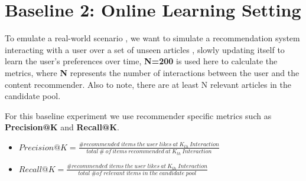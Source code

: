 \documentclass[a4paper,fontsize=8.0pt]{scrartcl}
\begin{document}
\section{Baseline 2: Online Learning Setting}
\begin{flushleft}
To emulate a real-world scenario , we want to simulate a recommendation system interacting with a user over a set of unseen articles , slowly updating itself to learn the user's preferences over time, \textbf{N=200} is used here to calculate the metrics, where \textbf{N }represents the number of interactions between the user and the content recommender. Also to note, there are at least N relevant articles in the candidate pool. 
\end{flushleft}
\begin{flushleft}
For this baseline experiment we use recommender specific metrics such as \textbf{Precision@K} and \textbf{Recall@K}.
\begin{itemize}
    \item $Precision@K = \frac{\# recommended \; items \: the \: user \; likes \: at \: K_{th} \: Interaction}{total \: \#  \: of \: items \:  recommended \: at \: K_{th} \: Interaction}$
    
    \item $Recall@K = \frac{\# recommended \; items \: the \: user \; likes \: at \: K_{th} \; Interaction}{total \; \# of \; relevant \; items \; in \; the \; candidate \; pool}$
    

\end{itemize}
\end{flushleft}
\end{document}
